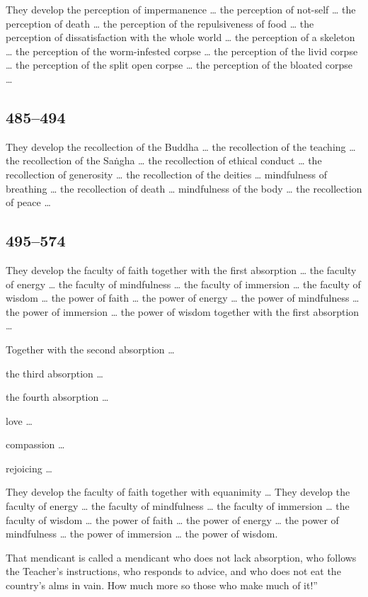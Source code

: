 \documentclass[12pt,openany]{book}%
\begin{document}
They develop the perception of impermanence … the perception of not-self … the perception of death … the perception of the repulsiveness of food … the perception of dissatisfaction with the whole world … the perception of a skeleton … the perception of the worm-infested corpse … the perception of the livid corpse … the perception of the split open corpse … the perception of the bloated corpse … 

\subsection*{485–494 }

They develop the recollection of the Buddha … the recollection of the teaching … the recollection of the \textsanskrit{Saṅgha} … the recollection of ethical conduct … the recollection of generosity … the recollection of the deities … mindfulness of breathing … the recollection of death … mindfulness of the body … the recollection of peace … 

\subsection*{495–574 }

They develop the faculty of faith together with the first absorption … the faculty of energy … the faculty of mindfulness … the faculty of immersion … the faculty of wisdom … the power of faith … the power of energy … the power of mindfulness … the power of immersion … the power of wisdom together with the first absorption … 

Together with the second absorption … 

the third absorption … 

the fourth absorption … 

love … 

compassion … 

rejoicing … 

They develop the faculty of faith together with equanimity … They develop the faculty of energy … the faculty of mindfulness … the faculty of immersion … the faculty of wisdom … the power of faith … the power of energy … the power of mindfulness … the power of immersion … the power of wisdom. 

That mendicant is called a mendicant who does not lack absorption, who follows the Teacher’s instructions, who responds to advice, and who does not eat the country’s alms in vain. How much more so those who make much of it!” 
\end{document}
